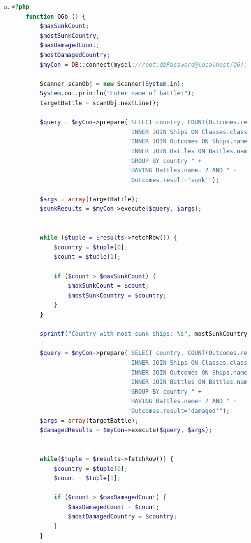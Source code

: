 \documentclass[12pt]{article}
\begin{document}
\begin{enumerate}[1.]
\begin{enumerate}[a)]
        \item

    \begin{lstlisting}[language=PHP]
    <?php
    function Q6b () {
        $maxSunkCount;
        $mostSunkCountry;
        $maxDamagedCount;
        $mostDamagedCountry;
        $myCon = DB::connect(mysql://root:dbPassword@localhost/Q6);

        Scanner scanObj = new Scanner(System.in);
        System.out.println("Enter name of battle:");
        targetBattle = scanObj.nextLine();

        $query = $myCon->prepare("SELECT country, COUNT(Outcomes.result) FROM Classes " +
                                 "INNER JOIN Ships ON Classes.class = Ships.class " +
                                 "INNER JOIN Outcomes ON Ships.name = Outcomes.ship " +
                                 "INNER JOIN Battles ON Battles.name = Outcome.battle " +
                                 "GROUP BY country " +
                                 "HAVING Battles.name= ? AND " +
                                 "Outcomes.result='sunk'");

        $args = array(targetBattle);
        $sunkResults = $myCon->execute($query, $args);


        while ($tuple = $results->fetchRow()) {
            $country = $tuple[0];
            $count = $tuple[1];

            if ($count > $maxSunkCount) {
                $maxSunkCount = $count;
                $mostSunkCountry = $country;
            }
        }

        sprintf("Country with most sunk ships: %s", mostSunkCountry);

        $query = $myCon->prepare("SELECT country, COUNT(Outcomes.result) FROM Classes " +
                                 "INNER JOIN Ships ON Classes.class = Ships.class " +
                                 "INNER JOIN Outcomes ON Ships.name = Outcomes.ship " +
                                 "INNER JOIN Battles ON Battles.name = Outcome.battle " +
                                 "GROUP BY country " +
                                 "HAVING Battles.name= ? AND " +
                                 "Outcomes.result='damaged'");
        $args = array(targetBattle);
        $damagedResults = $myCon->execute($query, $args);


        while($tuple = $results->fetchRow()) {
            $country = $tuple[0];
            $count = $tuple[1];

            if ($count > $maxDamagedCount) {
                $maxDamagedCount = $count;
                $mostDamagedCountry = $country;
            }
        }


\end{lstlisting}
\end{enumerate}
\end{enumerate}
\end{document}
